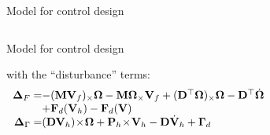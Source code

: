 \documentclass{beamer}
\begin{document}
\begin{frame}{Model for control design}
\begin{columns}
\begin{block}{Model for control design}
		
		\noindent with the ``disturbance'' terms: 
		\[
		\begin{array}{rl}
		\mathbf{\Delta}_F =\!\!\!\!\!\!& -(\mathbf{M}\mathbf{V}_f)_\times \mathbf{\Omega} -\mathbf{M} \mathbf{\Omega}_\times \mathbf{V}_f + (\mathbf{D}^\top \mathbf{\Omega})_\times \mathbf{\Omega} -\mathbf{D}^\top \dot{\mathbf{\Omega}}\\
		&+ \mathbf{F}_d(\mathbf{V}_h) - \mathbf{F}_d(\mathbf{V}) \\
		\mathbf{\Delta}_{\Gamma} =\!\!\!\!\!\! &(\mathbf{DV}_h)\!\times \!\mathbf{\Omega} + \mathbf{P}_h \!\times \!\mathbf{V}_h  - \mathbf{D}\dot{\mathbf{V}}_h  + \mathbf{\Gamma}_d\vspace{-0.1cm}
		\end{array} %
		\]
	\end{block}
\end{columns}
	
\end{frame}
\end{document}

